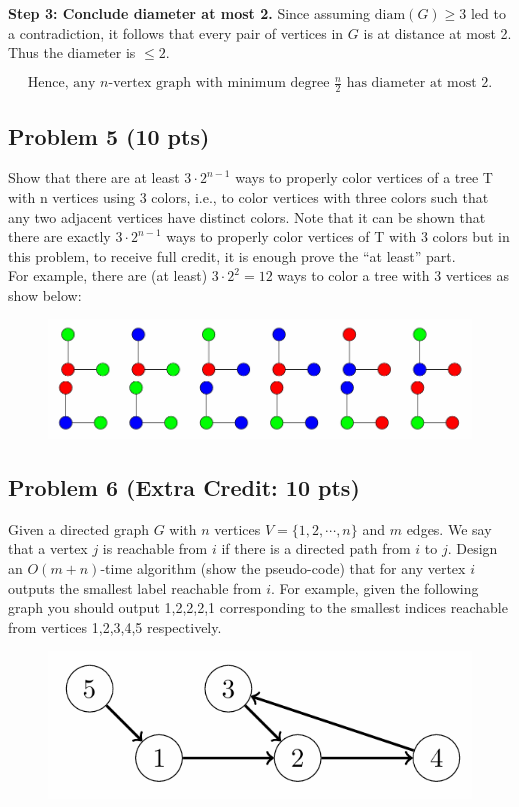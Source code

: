 \documentclass[12pt]{article}
\begin{document}
\bigskip
\textbf{Step 3: Conclude diameter at most 2.}
Since assuming \(\mathrm{diam}(G)\ge3\) led to a contradiction, it follows that every pair of vertices in \(G\) is at distance at most 2. Thus the diameter is \(\le2\).

\[
\boxed{\text{Hence, any }n\text{-vertex graph with minimum degree }\tfrac{n}{2}
\text{ has diameter at most }2.}
\]

\subsection*{Problem 5 (10 pts)}
Show that there are at least $3\cdot2^{n-1}$ ways to properly color vertices of a tree T with n vertices using 3 colors, i.e., to color vertices with three colors such that any two adjacent vertices have  distinct colors. Note that it can be shown that there are exactly $3\cdot2^{n-1}$ ways to properly color vertices of T with 3 colors but in this problem, to receive full credit, it is enough prove the “at least” part.\\
For example, there are (at least) $3\cdot2^2 = 12$ ways to color a tree with 3 vertices as show below:

\begin{figure}[H]
    \centering
    \includegraphics[width=0.8\linewidth]{P5.png}
    \label{fig:3-color-graph}
\end{figure}

\subsection*{Problem 6 (Extra Credit: 10 pts)}
Given a directed graph $G$ with $n$ vertices $V = \{1,2,\cdots,n\}$ and $m$ edges. We say that a vertex $j$ is reachable from $i$ if there is a directed path from $i$ to $j$. Design an $O(m+n)$-time algorithm (show the pseudo-code) that for any vertex $i$ outputs the smallest label reachable from $i$. For example, given the following graph you should output 1,2,2,2,1 corresponding to the smallest indices reachable from vertices 1,2,3,4,5 respectively.
\begin{figure}[H]
    \centering
    \includegraphics[width=0.5\linewidth]{P6.png}
    \label{fig:P6}
\end{figure}
\end{document}
